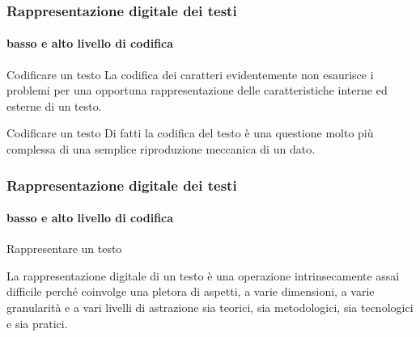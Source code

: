 







\begin{frame}
	\frametitle{Rappresentazione digitale dei testi}
	\framesubtitle{basso e alto livello di codifica}
	\addtocounter{nframe}{1}

	\begin{block}{Codificare un testo}
		La codifica dei caratteri evidentemente non esaurisce i problemi per una opportuna rappresentazione delle caratteristiche interne ed esterne di un testo.
    \end{block}
    
    \begin{block}{Codificare un testo}
		Di fatti la codifica del testo è una questione molto più complessa di una semplice riproduzione meccanica di un dato.
	\end{block}


\end{frame}


\begin{frame}
	\frametitle{Rappresentazione digitale dei testi}
	\framesubtitle{basso e alto livello di codifica}
	\addtocounter{nframe}{1}

	\begin{block}{Rappresentare un testo}
		
			La rappresentazione digitale di un testo è una operazione intrinsecamente assai difficile perché coinvolge una pletora di aspetti, a varie dimensioni, a varie granularità e a vari livelli di astrazione sia teorici, sia metodologici, sia tecnologici e sia pratici.
		
	\end{block}

\end{frame}

